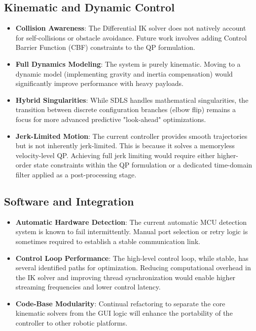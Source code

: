 \documentclass[12pt,a4paper]{report}
\begin{document}
\subsection{Kinematic and Dynamic Control}
\begin{itemize}
    \item \textbf{Collision Awareness}: The Differential IK solver does not natively account for self-collisions or obstacle avoidance. Future work involves adding Control Barrier Function (CBF) constraints to the QP formulation.
    \item \textbf{Full Dynamics Modeling}: The system is purely kinematic. Moving to a dynamic model (implementing gravity and inertia compensation) would significantly improve performance with heavy payloads.
    \item \textbf{Hybrid Singularities}: While SDLS handles mathematical singularities, the transition between discrete configuration branches (elbow flip) remains a focus for more advanced predictive "look-ahead" optimizations.
    \item \textbf{Jerk-Limited Motion}: The current controller provides smooth trajectories but is not inherently jerk-limited. This is because it solves a memoryless velocity-level QP. Achieving full jerk limiting would require either higher-order state constraints within the QP formulation or a dedicated time-domain filter applied as a post-processing stage.
\end{itemize}

\subsection{Software and Integration}
\begin{itemize}
    \item \textbf{Automatic Hardware Detection}: The current automatic MCU detection system is known to fail intermittently. Manual port selection or retry logic is sometimes required to establish a stable communication link.
    \item \textbf{Control Loop Performance}: The high-level control loop, while stable, has several identified paths for optimization. Reducing computational overhead in the IK solver and improving thread synchronization would enable higher streaming frequencies and lower control latency.
    \item \textbf{Code-Base Modularity}: Continual refactoring to separate the core kinematic solvers from the GUI logic will enhance the portability of the controller to other robotic platforms.
\end{itemize}
\end{document}
